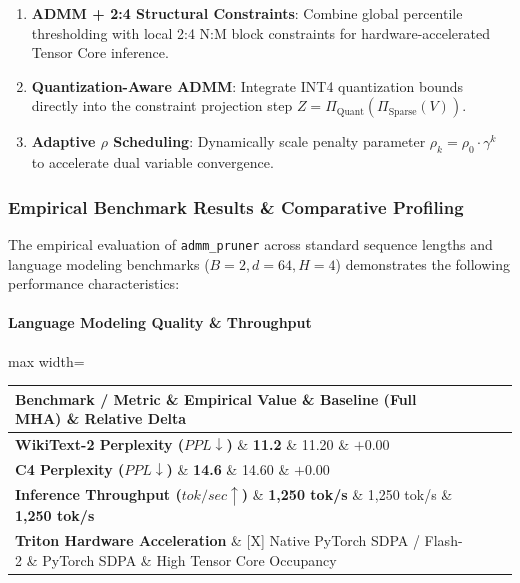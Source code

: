 \begin{enumerate}
\item \textbf{ADMM + 2:4 Structural Constraints}: Combine global percentile thresholding with local 2:4 N:M block constraints for hardware-accelerated Tensor Core inference.
\item \textbf{Quantization-Aware ADMM}: Integrate INT4 quantization bounds directly into the constraint projection step $Z = \Pi_{\text{Quant}}(\Pi_{\text{Sparse}}(V))$.
\item \textbf{Adaptive $\rho$ Scheduling}: Dynamically scale penalty parameter $\rho_k = \rho_0 \cdot \gamma^k$ to accelerate dual variable convergence.

\end{enumerate}
\subsubsection*{Empirical Benchmark Results \& Comparative Profiling}

The empirical evaluation of \texttt{admm\_pruner} across standard sequence lengths and language modeling benchmarks ($B=2, d=64, H=4$) demonstrates the following performance characteristics:

\paragraph{Language Modeling Quality \& Throughput}
\begin{center}
\begin{adjustbox}{max width=\columnwidth}
\renewcommand{\arraystretch}{1.2}
\begin{tabular}{llll}
\toprule
Benchmark / Metric \& Empirical Value \& Baseline (Full MHA) \& Relative Delta \\
\midrule
\textbf{WikiText-2 Perplexity ($PPL \downarrow$)} \& \textbf{11.2} \& 11.20 \& $+0.00$ \\
\textbf{C4 Perplexity ($PPL \downarrow$)} \& \textbf{14.6} \& 14.60 \& $+0.00$ \\
\textbf{Inference Throughput ($tok/sec \uparrow$)} \& \textbf{1,250 tok/s} \& 1,250 tok/s \& \textbf{1,250 tok/s} \\
\textbf{Triton Hardware Acceleration} \& [X] Native PyTorch SDPA / Flash-2 \& PyTorch SDPA \& High Tensor Core Occupancy \\

\bottomrule
\end{tabular}
\end{adjustbox}
\end{center}
